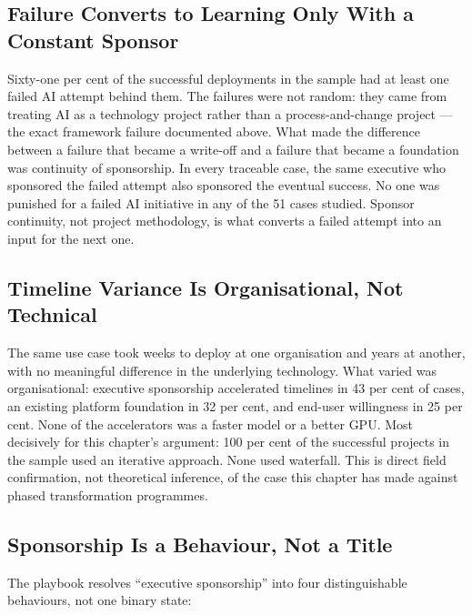 \subsection{Failure Converts to Learning Only With a Constant Sponsor}

Sixty-one per cent of the successful deployments in the sample had at least one failed AI attempt behind them. The failures were not random: they came from treating AI as a technology project rather than a process-and-change project --- the exact framework failure documented above. What made the difference between a failure that became a write-off and a failure that became a foundation was continuity of sponsorship. In every traceable case, the same executive who sponsored the failed attempt also sponsored the eventual success. No one was punished for a failed AI initiative in any of the 51 cases studied. Sponsor continuity, not project methodology, is what converts a failed attempt into an input for the next one.

\subsection{Timeline Variance Is Organisational, Not Technical}

The same use case took weeks to deploy at one organisation and years at another, with no meaningful difference in the underlying technology. What varied was organisational: executive sponsorship accelerated timelines in 43 per cent of cases, an existing platform foundation in 32 per cent, and end-user willingness in 25 per cent. None of the accelerators was a faster model or a better GPU. Most decisively for this chapter's argument: 100 per cent of the successful projects in the sample used an iterative approach. None used waterfall. This is direct field confirmation, not theoretical inference, of the case this chapter has made against phased transformation programmes.

\subsection{Sponsorship Is a Behaviour, Not a Title}

The playbook resolves ``executive sponsorship'' into four distinguishable behaviours, not one binary state:

